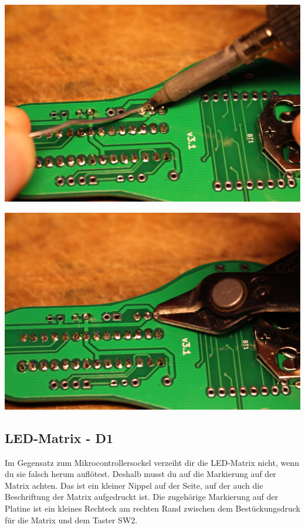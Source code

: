 \documentclass{article}
\begin{document}
\begin{minipage}[b]{0.5\textwidth}
	\includegraphics[width=\textwidth]{Bilder2021/IMG_8151.JPG}
\end{minipage}
\begin{minipage}[b]{0.5\textwidth}
	\includegraphics[width=\textwidth]{Bilder2021/IMG_8152.JPG}
\end{minipage}

\subsection{LED-Matrix - D1}

Im Gegensatz zum Mikrocontrollersockel verzeiht dir die LED-Matrix nicht, wenn du sie falsch herum auflötest. Deshalb musst du auf die Markierung auf der Matrix achten. Das ist ein kleiner Nippel auf der Seite, auf der auch die Beschriftung der Matrix aufgedruckt ist. Die zugehörige Markierung auf der Platine ist ein kleines Rechteck am rechten Rand zwischen dem Bestückungsdruck für die Matrix und dem Taster SW2.
\end{document}
